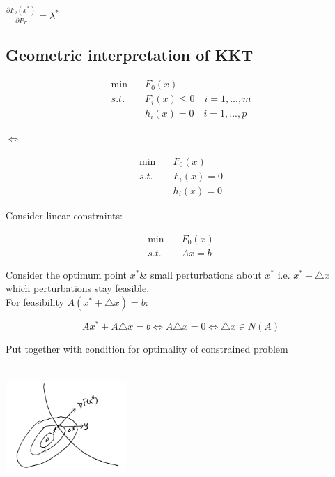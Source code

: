 $\frac{\partial F_o(x^*)}{\partial P_T} = \lambda^*$

\subsection{Geometric interpretation of KKT}

\begin{align*}
\min \quad & F_0(x)\\
s.t. \quad & F_i(x)\leq 0\quad i=1,...,m\\
&h_i(x) = 0\quad i=1,...,p
\end{align*}

$\Leftrightarrow$ 

\begin{align*}
\min \quad & F_0(x)\\
s.t. \quad & F_i(x)= 0\\
&h_i(x) = 0
\end{align*}

Consider linear constraints:

\begin{align*}
\min \quad & F_0(x)\\
s.t. \quad & Ax = b
\end{align*}

Consider the optimum point $x^*$\& small perturbations about $x^*$ i.e. $x^*+\triangle x$ which perturbations stay feasible.\\

For feasibility $A(x^*+\triangle x) = b$:

\begin{equation*}
Ax^* + A\triangle x = b\Leftrightarrow A\triangle x = 0\Leftrightarrow \triangle x \in N(A)
\end{equation*}

Put together with condition for optimality of constrained problem

\begin{marginfigure}
	\centering
	\includegraphics[width=1.8in,height=1.8in]{figures/ch10/figure1204_3.png}
\end{marginfigure}


